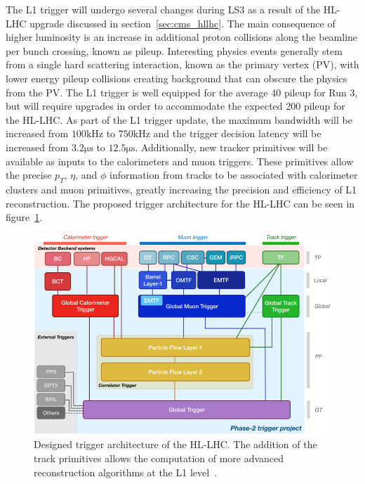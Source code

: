 The L1 trigger will undergo several changes during LS3 as a result of the HL-LHC upgrade discussed in section~\ref{sec:cms_hllhc}. The main consequence of higher luminosity is an increase in additional proton collisions along the beamline per bunch crossing, known as pileup. Interesting physics events generally stem from a single hard scattering interaction, known as the primary vertex (PV), with lower energy pileup collisions creating background that can obscure the physics from the PV. The L1 trigger is well equipped for the average 40 pileup for Run 3, but will require upgrades in order to accommodate the expected 200 pileup for the HL-LHC. As part of the L1 trigger update, the maximum bandwidth will be increased from $100\unit{\kilo\hertz}$ to $750\unit{\kilo\hertz}$ and the trigger decision latency will be increased from $3.2\unit{\micro\second}$ to $12.5\unit{\micro\second}$. Additionally, new tracker primitives will be available as inputs to the calorimeters and muon triggers. These primitives allow the precise $p_T$, $\eta$, and $\phi$ information from tracks to be associated with calorimeter clusters and muon primitives, greatly increasing the precision and efficiency of L1 reconstruction. The proposed trigger architecture for the HL-LHC can be seen in figure~\ref{fig:HL_L1_trig}.

\begin{figure} [htbp]
	\centering
	\includegraphics[width=0.65\linewidth]{figs/03_experiment/HLLHC_L1T.png}
	\caption[Designed trigger architecture of the HL-LHC. The addition of the track primitives allows the computation of more advanced reconstruction algorithms at the L1 level~\cite{inproceedings}.]{Designed trigger architecture of the HL-LHC. The addition of the track primitives allows the computation of more advanced reconstruction algorithms at the L1 level~\cite{inproceedings}.} 
	\label{fig:HL_L1_trig}
\end{figure}

